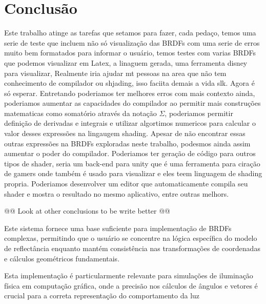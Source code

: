 
\chapter{Conclusão}

Este trabalho atinge as tarefas que setamos para fazer, cada pedaço, temos uma serie de teste que incluem não só visualização das BRDFs com uma serie de erros muito bem formatados para informar o usuário, temos testes com varias BRDFs que podemos visualizar em Latex, a linaguem gerada, uma ferramenta disney para visualizar, Realmente iria ajudar mt pessoas na area que não tem conhecimento de compilador ou shjading, isso faciita demais a vida slk. Agora é só esperar.
Entretando poderiamos ter melhores erros com mais contexto ainda, poderiamos aumentar as capacidades do compilador ao permitir mais construções matematicas como somatório através da notação $\Sigma$, poderiamos permitir definição de derivadas e integrais e utilizar algortimos numericos para calcular o valor desses expressões na lingaugem shading.  Apesar de não encontrar essas outras expressões na BRDFs exploradas neste trabalho, podesmos ainda assim aumentar o poder do compilador. Poderiamos ter geração de código para outros tipos de shader, seria um back-end para unity que é uma ferramenta para ciração de gamers onde também é usado para visualizar e eles teem linguagem de shading propria. Poderiamos desenvolver um editor que automaticamente compila seu shader e mostra o resultado no mesmo aplicativo, entre outras melhors. 

@@ Look at other conclusions to be write better @@

Este sistema fornece uma base suficiente para implementação de BRDFs complexas, permitindo que o usuário se concentre na lógica específica do modelo de reflectância enquanto mantém consistência nas transformações de coordenadas e cálculos geométricos fundamentais.

Esta implementação é particularmente relevante para simulações de iluminação física em computação gráfica, onde a precisão nos cálculos de ângulos e vetores é crucial para 
a correta representação do comportamento da luz

